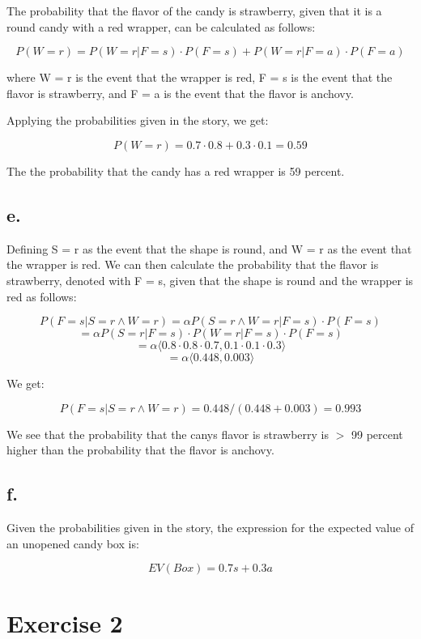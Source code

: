 \documentclass{article}
\begin{document}
The probability that the flavor of the candy is strawberry, given that it is a round candy with a red wrapper, can be calculated as follows:

\[P(W = r) = P(W = r | F = s) \cdot P(F = s) + P(W = r | F = a) \cdot P(F = a)\]

where W = r is the event that the wrapper is red, F = s is the event that the flavor is strawberry, and F = a is the event that the flavor is anchovy.

Applying the probabilities given in the story, we get:

\[P(W = r) = 0.7 \cdot 0.8 + 0.3 \cdot 0.1 = 0.59\]

The the probability that the candy has a red wrapper is 59 percent.


\subsection*{e.}

Defining S = r as the event that the shape is round, and W = r as the event that the wrapper is red. We can then calculate the probability that the flavor is strawberry, denoted with F = s, given that the shape is round and the wrapper is red as follows:

\[P(F = s | S = r \wedge W = r) = \alpha P(S = r \wedge W = r | F = s) \cdot P(F = s)\]
\[= \alpha P(S = r | F = s) \cdot P(W = r | F = s) \cdot P(F = s)\]
\[= \alpha \langle 0.8 \cdot 0.8 \cdot 0.7, 0.1 \cdot 0.1 \cdot 0.3 \rangle \]
\[= \alpha \langle 0.448, 0.003 \rangle\]

We get:

\[P(F = s | S = r \wedge W = r) = 0.448 / (0.448 + 0.003) = 0.993\]

We see that the probability that the canys flavor is strawberry is \(>\) 99 percent higher than the probability that the flavor is anchovy.

\subsection*{f.}

Given the probabilities given in the story, the expression for the expected value of an unopened candy box is:

\[EV(Box) = 0.7s + 0.3a\]


\section*{Exercise 2}
\end{document}

